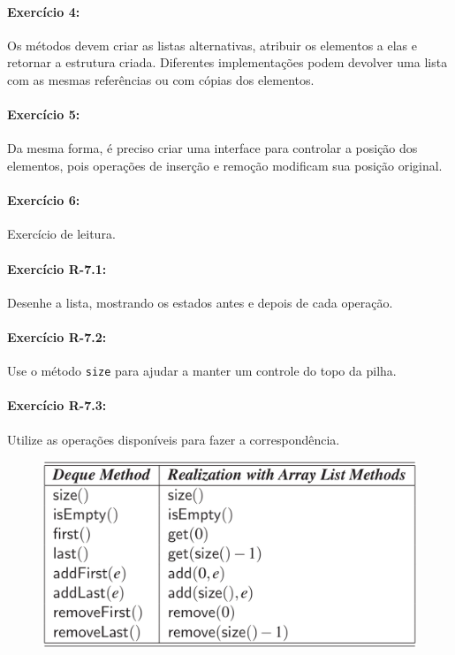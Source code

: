 \paragraph{Exercício 4:}
Os métodos devem criar as listas alternativas, atribuir os elementos a elas e retornar a estrutura criada. Diferentes implementações podem devolver uma lista com as mesmas referências ou com cópias dos elementos.

\paragraph{Exercício 5:}
Da mesma forma, é preciso criar uma interface para controlar a posição dos elementos, pois operações de inserção e remoção modificam sua posição original.

\paragraph{Exercício 6:}
Exercício de leitura.

\paragraph{Exercício R-7.1:}
Desenhe a lista, mostrando os estados antes e depois de cada operação.

\paragraph{Exercício R-7.2:}
Use o método \texttt{size} para ajudar a manter um controle do topo da pilha.

\paragraph{Exercício R-7.3:}
Utilize as operações disponíveis para fazer a correspondência.

\begin{figure}[H]
	\centering
	\includegraphics[width=0.6\linewidth]{img/r-7-3}
\end{figure}

